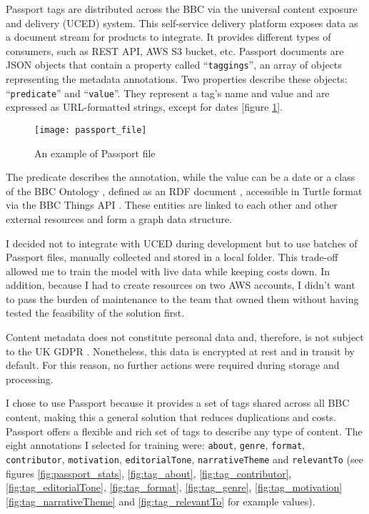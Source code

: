 Passport tags are distributed across the BBC via the universal content exposure and delivery (UCED) system.
This self-service delivery platform exposes data as a document stream for products to integrate.
It provides different types of consumers, such as REST API, AWS S3 bucket, etc.
Passport documents are JSON objects that contain a property called ``\verb|taggings|'', an array of objects representing the
metadata annotations. Two properties describe these objects: ``\verb|predicate|'' and ``\verb|value|''.
They represent a tag's name and value and are expressed as URL-formatted strings, except for dates [figure \ref{fig:passport_file}].

\begin{figure}[h]
  \centering
  \texttt{[image: passport\_file]}
  \caption{An example of Passport file}
  \label{fig:passport_file}
\end{figure}

The predicate describes the annotation, while the value can be a date or a class of the BBC Ontology \cite{BBC:Ontologies},
defined as an RDF document \cite{W3C:RDF,W3C:RDF:Concepts}, accessible in Turtle format \cite{W3C:Turtle}
via the BBC Things API \cite{BBC:Things,BBC:Things:About,BBC:Things:API}.
These entities are linked to each other and other external resources and form a graph data structure.


I decided not to integrate with UCED during development but to use batches of Passport files,
manually collected and stored in a local folder.
This trade-off allowed me to train the model with live data while keeping costs down.
In addition, because I had to create resources on two AWS accounts,
I didn't want to pass the burden of maintenance to the team that owned them without having tested the feasibility of the solution first.


Content metadata does not constitute personal data and, therefore, is not subject to the UK GDPR  \cite{UKGDPR}.
Nonetheless, this data is encrypted at rest and in transit by default.
For this reason, no further actions were required during storage and processing.


I chose to use Passport because it provides a set of tags shared across all BBC content,
making this a general solution that reduces duplications and costs.
Passport offers a flexible and rich set of tags to describe any type of content.
The eight annotations I selected for training were:
\verb|about|, \verb|genre|, \verb|format|, \verb|contributor|, \verb|motivation|,
\verb|editorialTone|, \verb|narrativeTheme| and \verb|relevantTo|
(see figures \ref{fig:passport_stats}, \ref{fig:tag_about}, \ref{fig:tag_contributor},
\ref{fig:tag_editorialTone}, \ref{fig:tag_format}, \ref{fig:tag_genre}, \ref{fig:tag_motivation}
\ref{fig:tag_narrativeTheme} and \ref{fig:tag_relevantTo} for example values).

